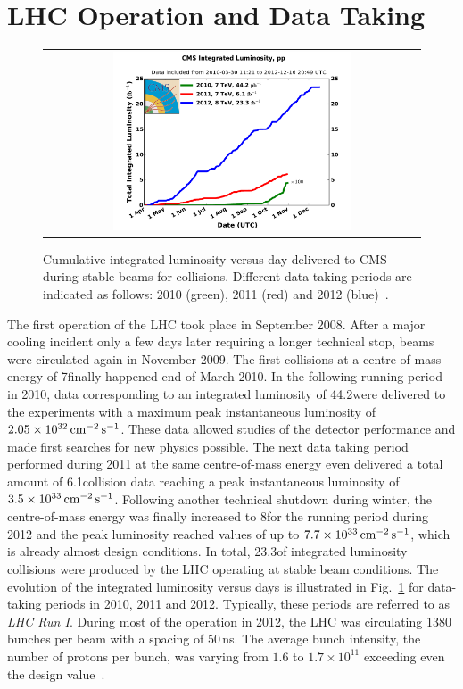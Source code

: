 \section{LHC Operation and Data Taking}
\label{sec:data}
\begin{figure}[!t]
  \centering
  \begin{tabular}{c}
    \includegraphics[width=0.65\textwidth]{figures/int_lumi_cumulative_pp_2.pdf}
  \end{tabular}
  \caption{Cumulative integrated luminosity versus day delivered to CMS during stable beams for \pp collisions. Different data-taking periods are indicated as follows: 2010 (green), 2011 (red) and 2012 (blue)~\cite{bib:lhc:lumi12}.}
  \label{fig:lhc_data}
\end{figure}
The first operation of the LHC took place in September 2008. After a major cooling incident only a few days later requiring a longer technical stop, beams were circulated again in November 2009. The first collisions at a centre-of-mass energy of 7\tev finally happened end of March 2010. 
In the following running period in 2010, data corresponding to an integrated luminosity of 44.2\pbinv were delivered to the experiments with a maximum peak instantaneous luminosity of $2.05 \times 10^{32} \,\text{cm}^{-2} \,\text{s}^{-1}$. These data allowed studies of the detector performance and made first searches for new physics possible. The next data taking period performed during 2011 at the same centre-of-mass energy even delivered a total amount of 6.1\fbinv \pp collision data reaching a peak instantaneous luminosity of $3.5 \times 10^{33} \,\text{cm}^{-2} \,\text{s}^{-1}$. Following another technical shutdown during winter, the centre-of-mass energy was finally increased to 8\tev for the running period during 2012 and the peak luminosity reached values of up to $7.7 \times 10^{33} \,\text{cm}^{-2} \,\text{s}^{-1}$, which is already almost design conditions. In total, 23.3\fbinv of integrated luminosity \pp collisions were produced by the LHC operating at stable beam conditions. The evolution of the integrated luminosity versus days is illustrated in Fig.~\ref{fig:lhc_data} for data-taking periods in 2010, 2011 and 2012. Typically, these periods are referred to as \textit{LHC Run I}. During most of the operation in 2012, the LHC was circulating 1380 bunches per beam with a spacing of 50\,ns. The average bunch intensity, \ie the number of protons per bunch, was varying from $1.6$ to $1.7 \times 10^{11}$ exceeding even the design value~\cite{bib:lhc:lumi12, Lamont:2013cma}. 
